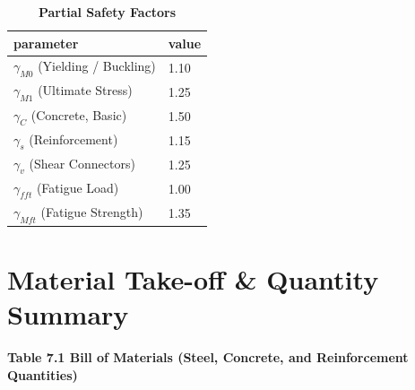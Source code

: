 \documentclass[12pt,a4paper]{report}
\numberwithin{table}{chapter}
\numberwithin{figure}{chapter}
\begin{document}
\vspace{0.4em}
\begin{longtable}{|L{5.5cm}|p{10.0cm}|}
\caption{\textbf{Partial Safety Factors}}
\hline
\textbf{parameter} & \textbf{value} \\
\hline
\textnormal{$\gamma_{M0}$ (Yielding / Buckling)} & 1.10 \\[6pt]
\hline
\textnormal{$\gamma_{M1}$ (Ultimate Stress)} & 1.25 \\[6pt]
\hline
\textnormal{$\gamma_C$ (Concrete, Basic)} & 1.50 \\[6pt]
\hline
\textnormal{$\gamma_s$ (Reinforcement)} & 1.15 \\[6pt]
\hline
\textnormal{$\gamma_v$ (Shear Connectors)} & 1.25 \\[6pt]
\hline
\textnormal{$\gamma_{fft}$ (Fatigue Load)} & 1.00 \\[6pt]
\hline
\textnormal{$\gamma_{Mft}$ (Fatigue Strength)} & 1.35 \\[6pt]
\hline
\end{longtable}


\chapter{Material Take-off \& Quantity Summary}
\label{ch:material-takeoff}

\noindent\textbf{Table 7.1  Bill of Materials (Steel, Concrete, and Reinforcement Quantities)}
\end{document}
